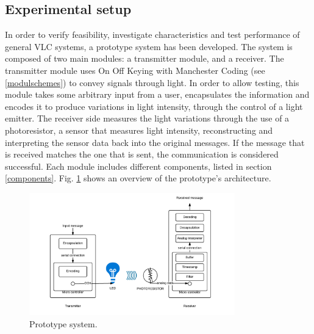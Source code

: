 \subsection{Experimental setup}
\label{expsetup}
In order to verify feasibility, investigate characteristics and test performance of general VLC systems, a prototype system has been developed.
The system is composed of two main modules: a transmitter module, and a receiver.
The transmitter module uses On Off Keying with Manchester Coding (see \ref{modulschemes})  to convey signals through light.
In order to allow testing, this module takes some arbitrary input from a user, encapsulates the information and encodes it to produce variations in light intensity, through the control of a light emitter.
The receiver side measures the light variations through the use of a photoresistor, a sensor that measures light intensity, reconstructing and interpreting the sensor data back into the original messages. 
If the message that is received matches the one that is sent, the communication is considered successful.
Each module includes different components, listed in section \ref{components}.
Fig. \ref{fig:sys over} shows an overview of the prototype's architecture.

\begin{figure}
\centering
\includegraphics[height=200px]{img/sysover}
\caption{Prototype system.}
\label{fig:sys over}
\end{figure}

